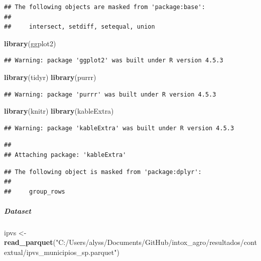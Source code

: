 \documentclass[
]{article}
\newenvironment{Shaded}{\begin{snugshade}}{\end{snugshade}}
\newcommand{\FunctionTok}[1]{\textcolor[rgb]{0.13,0.29,0.53}{\textbf{#1}}}
\newcommand{\NormalTok}[1]{#1}
\newcommand{\OtherTok}[1]{\textcolor[rgb]{0.56,0.35,0.01}{#1}}
\newcommand{\StringTok}[1]{\textcolor[rgb]{0.31,0.60,0.02}{#1}}
\begin{document}
\begin{verbatim}
## The following objects are masked from 'package:base':
## 
##     intersect, setdiff, setequal, union
\end{verbatim}

\begin{Shaded}
\begin{Highlighting}[]
\FunctionTok{library}\NormalTok{(ggplot2)}
\end{Highlighting}
\end{Shaded}

\begin{verbatim}
## Warning: package 'ggplot2' was built under R version 4.5.3
\end{verbatim}

\begin{Shaded}
\begin{Highlighting}[]
\FunctionTok{library}\NormalTok{(tidyr)}
\FunctionTok{library}\NormalTok{(purrr)}
\end{Highlighting}
\end{Shaded}

\begin{verbatim}
## Warning: package 'purrr' was built under R version 4.5.3
\end{verbatim}

\begin{Shaded}
\begin{Highlighting}[]
\FunctionTok{library}\NormalTok{(knitr)}
\FunctionTok{library}\NormalTok{(kableExtra)}
\end{Highlighting}
\end{Shaded}

\begin{verbatim}
## Warning: package 'kableExtra' was built under R version 4.5.3
\end{verbatim}

\begin{verbatim}
## 
## Attaching package: 'kableExtra'
\end{verbatim}

\begin{verbatim}
## The following object is masked from 'package:dplyr':
## 
##     group_rows
\end{verbatim}

\subparagraph{Dataset}\label{dataset}

\begin{Shaded}
\begin{Highlighting}[]
\NormalTok{ipvs }\OtherTok{\textless{}{-}} \FunctionTok{read\_parquet}\NormalTok{(}\StringTok{"C:/Users/alyss/Documents/GitHub/intox\_agro/resultados/contextual/ipvs\_municipios\_sp.parquet"}\NormalTok{)}
\end{Highlighting}
\end{Shaded}
\end{document}
